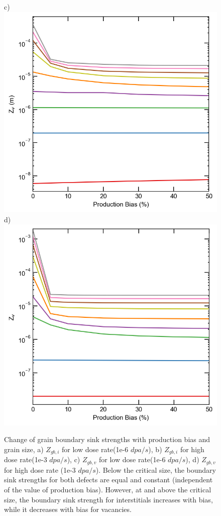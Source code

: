 \documentclass[utf8]{frontiersSCNS} %
\begin{document}
\begin{figure}[h!]
        c)\includegraphics[scale=0.5]{Fig10_c}
        d)\includegraphics[scale=0.5]{Fig10_d}
        \caption{Change of grain boundary sink strengths with production bias and grain size, a) $Z_{gb,i}$ for low dose rate(1e-6 $dpa/s$), b) $Z_{gb,i}$ for high dose rate(1e-3 $dpa/s$), c) $Z_{gb,v}$ for low dose rate(1e-6 $dpa/s$), d) $Z_{gb,v}$ for high dose rate (1e-3 $dpa/s$). Below the critical size, the boundary sink strengths for both defects are equal and constant (independent of the value of production bias). However, at and above the critical size, the boundary sink strength for interstitials increases with bias, while it decreases with bias for vacancies.}
        \label{figure:sink_strengths_neutron_bias_Z}
    \end{figure}
    
\end{document}
